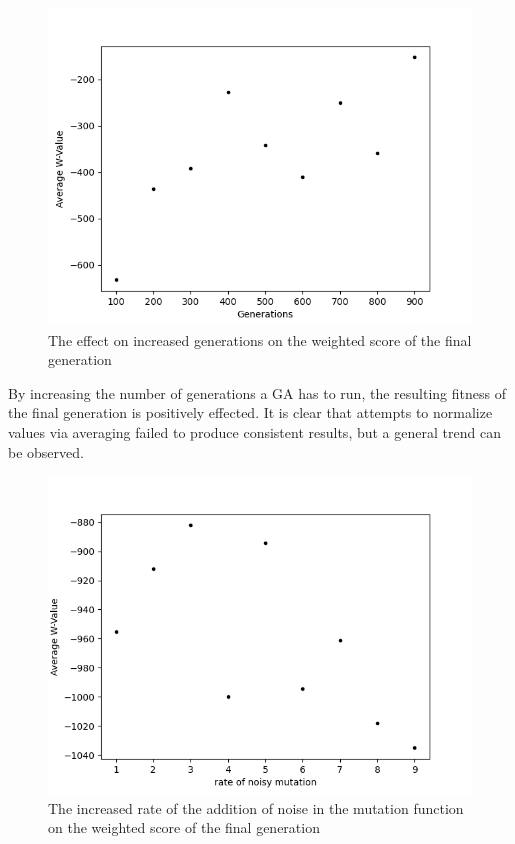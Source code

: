 \documentclass[12pt, conference]{IEEEtran}
\begin{document}
\begin{figure}[htb]
\centerline{\includegraphics[scale=0.5]{Figures/Generation_Averages.png}}
\caption{The effect on increased generations on the weighted score of the final generation}
\label{fig. 1}
\end{figure}

\par
By increasing the number of generations a GA has to run, the resulting fitness of the final generation is positively effected.
It is clear that attempts to normalize values via averaging failed to produce consistent results, but a general trend can be observed.

\begin{figure}[H]
\centerline{\includegraphics[scale=0.5]{Figures/Mutation_Chance_Averages.png}}
\caption{The increased rate of the addition of noise in the mutation function on the weighted score of the final generation}
\label{fig. 2}
\end{figure}
\end{document}
